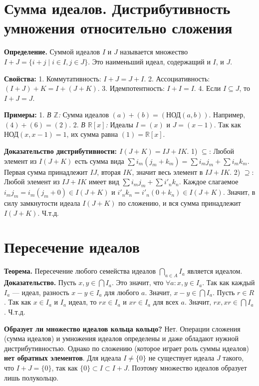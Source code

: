 \documentclass[12pt, a4paper]{article}
\theoremstyle{definition}
\theoremstyle{remark}
\begin{document}
\section{Сумма идеалов. Дистрибутивность умножения относительно сложения}


\textbf{Определение.} Суммой идеалов $I$ и $J$ называется множество $I + J = \{i + j \mid i \in I, j \in J\}$. Это наименьший идеал, содержащий и $I$, и $J$.

\textbf{Свойства:}
1. Коммутативность: $I + J = J + I$.
2. Ассоциативность: $(I + J) + K = I + (J + K)$.
3. Идемпотентность: $I + I = I$.
4. Если $I \subseteq J$, то $I + J = J$.

\textbf{Примеры:}
1. \textit{В $\mathbb{Z}$:} Сумма идеалов $(a) + (b) = (\text{НОД}(a, b))$. Например, $(4) + (6) = (2)$.
2. \textit{В $\mathbb{R}[x]$:} Идеалы $I = (x)$ и $J = (x-1)$. Так как $\text{НОД}(x, x-1) = 1$, их сумма равна $(1) = \mathbb{R}[x]$.

\textbf{Доказательство дистрибутивности: $I(J+K) = IJ + IK$}.
1) $\subseteq$: Любой элемент из $I(J+K)$ есть сумма вида $\sum i_m (j_m + k_m) = \sum i_m j_m + \sum i_m k_m$. Первая сумма принадлежит $IJ$, вторая $IK$, значит весь элемент в $IJ + IK$.
2) $\supseteq$: Любой элемент из $IJ + IK$ имеет вид $\sum i_m j_m + \sum i'_n k_n$. Каждое слагаемое $i_m j_m = i_m(j_m + 0) \in I(J+K)$ и $i'_n k_n = i'_n(0 + k_n) \in I(J+K)$. Значит, в силу замкнутости идеала $I(J+K)$ по сложению, и вся сумма принадлежит $I(J+K)$. Ч.т.д.

\section{Пересечение идеалов}


\textbf{Теорема.} Пересечение любого семейства идеалов $\bigcap_{a \in A} I_a$ является идеалом.
\textbf{Доказательство.} Пусть $x, y \in \bigcap I_a$. Это значит, что $\forall a: x, y \in I_a$. 
Так как каждый $I_a$ — идеал, разность $x - y \in I_a$ для любого $a$. Значит, $x - y \in \bigcap I_a$.
Пусть $r \in R$. Так как $x \in I_a$ и $I_a$ идеал, то $rx \in I_a$ и $xr \in I_a$ для всех $a$. Значит, $rx, xr \in \bigcap I_a$. Ч.т.д.

\textbf{Образует ли множество идеалов кольца кольцо?}
Нет. Операции сложения (сумма идеалов) и умножения идеалов определены и даже обладают нужной дистрибутивностью. Однако по сложению (которое играет роль суммы идеалов) \textbf{нет обратных элементов}. Для идеала $I \neq \{0\}$ не существует идеала $J$ такого, что $I + J = \{0\}$, так как $\{0\} \subset I \subset I+J$. Поэтому множество идеалов образует лишь полукольцо.
\end{document}
